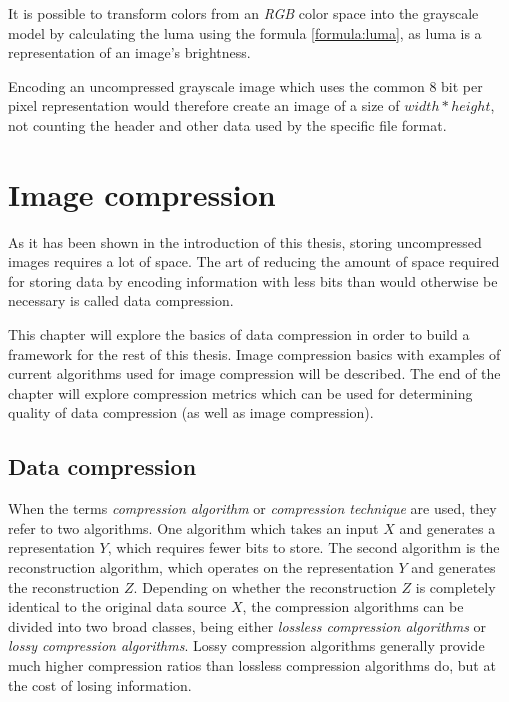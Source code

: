 \documentclass[thesis=M,english]{FITthesis}[2012/10/20]
\begin{document}
It is possible to transform colors from an \emph{RGB} color space into
the grayscale model by calculating the luma using the formula \ref{formula:luma},
as luma is a representation of an image's brightness.

Encoding an uncompressed grayscale image which uses the common 8 bit per pixel
representation would therefore create an image of a size of $width*height$, not counting
the header and other data used by the specific file format.


\chapter{Image compression}
\label{ch:image-compression}
As it has been shown in the introduction of this thesis, storing uncompressed
images requires a lot of space. The art of reducing the amount of space required
for storing data by encoding information with less bits than would otherwise
be necessary is called data compression.

This chapter will explore the basics of data compression in order to build
a framework for the rest of this thesis. Image compression basics with examples
of current algorithms used for image compression will be described. The end of
the chapter will explore compression metrics which can be used for determining
quality of data compression (as well as image compression).


\section{Data compression}
\label{ch:data_compression}
When the terms \emph{compression algorithm} or \emph{compression technique} are
used, they refer to two algorithms. One algorithm which takes an input $X$ and
generates a representation $Y$, which requires fewer bits to store. The second
algorithm is the reconstruction algorithm, which operates on the representation
$Y$ and generates the reconstruction $Z$. Depending on whether the reconstruction
$Z$ is completely identical to the original data source $X$, the compression
algorithms can be divided into two broad classes, being either \emph{lossless
compression algorithms} or \emph{lossy compression algorithms}. Lossy compression
algorithms generally provide much higher compression ratios than lossless compression algorithms
do, but at the cost of losing information.\cite{datacompression}
\end{document}
